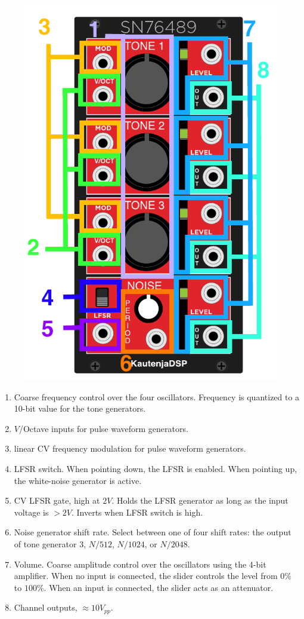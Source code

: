 \documentclass[12pt,a4paper]{article}
\begin{document}
\begin{figure}[!htp]
\centering
\includegraphics{SN76489-Manual}
\end{figure}

\begin{enumerate}
  \item Coarse frequency control over the four oscillators. Frequency is quantized to a 10-bit value for the tone generators.
  \item $V$/Octave inputs for pulse waveform generators.
  \item linear CV frequency modulation for pulse waveform generators.
  \item LFSR switch. When pointing down, the LFSR is enabled. When pointing up, the white-noise generator is active.
  \item CV LFSR gate, high at $2V$. Holds the LFSR generator as long as the input voltage is $>2V$. Inverts when LFSR switch is high.
  \item Noise generator shift rate. Select between one of four shift rates: the output of tone generator 3, $N / 512$, $N / 1024$, or $N / 2048$.
  \item Volume. Coarse amplitude control over the oscillators using the 4-bit amplifier. When no input is connected, the slider controls the level from $0\%$ to $100\%$. When an input is connected, the slider acts as an attenuator.
  \item Channel outputs, ${\approx}10V_{pp}$.
\end{enumerate}


\clearpage
\renewcommand\refname{References \& Acknowledgments}
\nocite{*}


\end{document}
